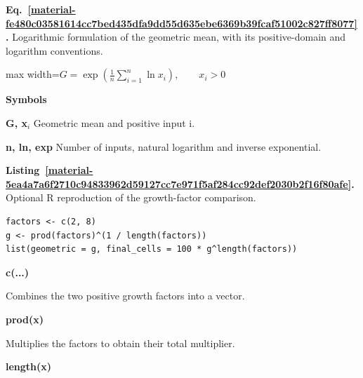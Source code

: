 \documentclass[11pt,a4paper]{article}
\newcounter{listing}
\begin{document}
\par\medskip
\begin{samepage}
\label{material-fe480c03581614cc7bed435dfa9dd55d635ebe6369b39fcaf51002c827ff8077}
\noindent\textbf{Eq.~\ref*{material-fe480c03581614cc7bed435dfa9dd55d635ebe6369b39fcaf51002c827ff8077}.} Logarithmic formulation of the geometric mean, with its positive-domain and logarithm conventions.\par\nopagebreak
\begin{center}\begin{adjustbox}{max width=\linewidth}$\displaystyle G = \exp\left(\frac{1}{n}\sum_{i=1}^{n}\ln x_i\right), \qquad x_i > 0$\end{adjustbox}\end{center}

\par\noindent\textbf{Symbols}

\par\noindent\textbf{G, x\ensuremath{{}_i}} Geometric mean and positive input i.

\par\noindent\textbf{n, ln, exp} Number of inputs, natural logarithm and inverse exponential.

\end{samepage}
\medskip

\par\medskip
{}
\label{material-5ea4a7a6f2710c94833962d59127cc7e971f5af284cc92def2030b2f16f80afe}
\noindent\textbf{Listing~\ref*{material-5ea4a7a6f2710c94833962d59127cc7e971f5af284cc92def2030b2f16f80afe}.} Optional R reproduction of the growth-factor comparison.\par\nopagebreak
\begin{Verbatim}[fontsize=\footnotesize,breaklines=true,breakanywhere=true]
factors <- c(2, 8)
g <- prod(factors)^(1 / length(factors))
list(geometric = g, final_cells = 100 * g^length(factors))
\end{Verbatim}

\par\noindent\textbf{c(...)}

Combines the two positive growth factors into a vector.

\par\noindent\textbf{prod(x)}

Multiplies the factors to obtain their total multiplier.

\par\noindent\textbf{length(x)}
\end{document}
